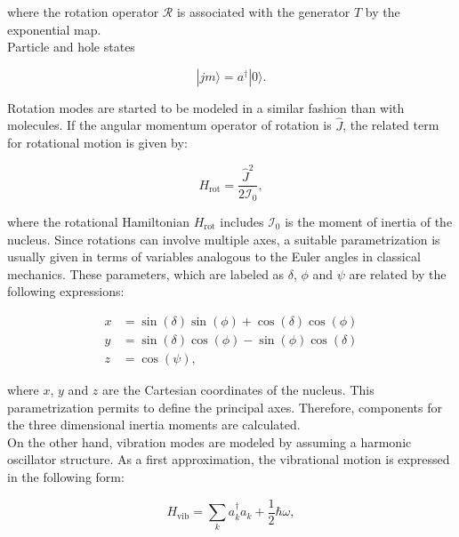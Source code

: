 \documentclass[openany]{book}
\begin{document}
where the rotation operator $\mathcal{R}$ is associated with the generator $T$ by the exponential map. \\

Particle and hole states 


\begin{equation}\label{eq:nuclearMotion_ladder }
	| jm \rangle = a^{\dagger} |0\rangle.
\end{equation}


Rotation modes are started to be modeled in a similar fashion than with molecules. If the angular momentum operator of rotation is $\hat J$, the related term for rotational motion is given by:

\begin{equation}\label{eq:nuclearMotion_rotation}
	H_{\mathrm{rot}} =  \frac{\hat J^2}{2\mathcal{I}_0},
\end{equation}

where the rotational Hamiltonian $H_{\mathrm{rot}}$ includes $\mathcal{I}_0$ is the moment of inertia of the nucleus. Since rotations can involve multiple axes, a suitable parametrization is usually given in terms of variables analogous to the Euler angles in classical mechanics. These parameters, which are labeled as $\delta$, $\phi$ and $\psi$ are related by the following expressions: 

\begin{equation}\label{eq:nuclearMotion_angles}
	\begin{split}
		x &=  \sin {(\delta)} \sin{(\phi)}  + \cos {(\delta)} \cos {(\phi)} \\
		y &= \sin {(\delta)} \cos {(\phi)} - \sin {(\phi)} \cos {(\delta)} \\
		z &= \cos {(\psi)},
	\end{split}
\end{equation}

where $x$, $y$ and $z$ are the Cartesian coordinates of the nucleus. This parametrization permits to define the principal axes. Therefore, components for the three dimensional inertia moments are calculated. \\

On the other hand, vibration modes are modeled by assuming a harmonic oscillator structure. As a first approximation, the vibrational motion is expressed in the following form:  

\begin{equation}\label{eq:nuclearMotion_vibration}
	H_{\mathrm{vib}}	=  \sum_{k}{a_k^{\dagger}a_k}  + \frac{1}{2} \hbar \omega, 
\end{equation}
\end{document}
